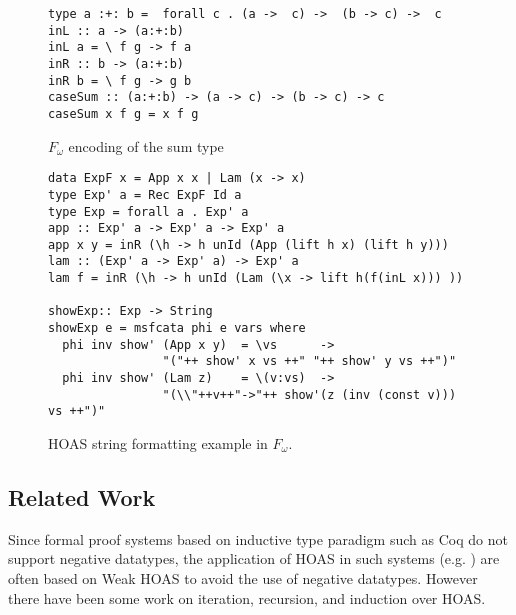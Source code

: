 \begin{figure}
\begin{verbatim}
type a :+: b =  forall c . (a ->  c) ->  (b -> c) ->  c
inL :: a -> (a:+:b)
inL a = \ f g -> f a
inR :: b -> (a:+:b)
inR b = \ f g -> g b
caseSum :: (a:+:b) -> (a -> c) -> (b -> c) -> c
caseSum x f g = x f g
\end{verbatim}
\caption{$F_\omega$ encoding of the sum type}
\label{fig:sumdef}
\end{figure}

\begin{figure}
\begin{verbatim}
data ExpF x = App x x | Lam (x -> x)
type Exp' a = Rec ExpF Id a
type Exp = forall a . Exp' a
app :: Exp' a -> Exp' a -> Exp' a
app x y = inR (\h -> h unId (App (lift h x) (lift h y)))
lam :: (Exp' a -> Exp' a) -> Exp' a
lam f = inR (\h -> h unId (Lam (\x -> lift h(f(inL x))) ))

showExp:: Exp -> String
showExp e = msfcata phi e vars where
  phi inv show' (App x y)  = \vs      ->
                "("++ show' x vs ++" "++ show' y vs ++")"
  phi inv show' (Lam z)    = \(v:vs)  ->
                "(\\"++v++"->"++ show'(z (inv (const v))) vs ++")"
\end{verbatim}

\caption{HOAS string formatting example in $F_\omega$.}
\label{fig:HOASshowFw}
\end{figure}

\subsection{Related Work} \label{ssec:MendlerRW}


Since formal proof systems based on inductive type paradigm such as Coq
do not support negative datatypes, the application of HOAS in such systems
(e.g. \cite{Chl08}) are often based on Weak HOAS \cite{Des95,HonMicSca01}
to avoid the use of negative datatypes. However there have been some work
on iteration, recursion, and induction over HOAS.

